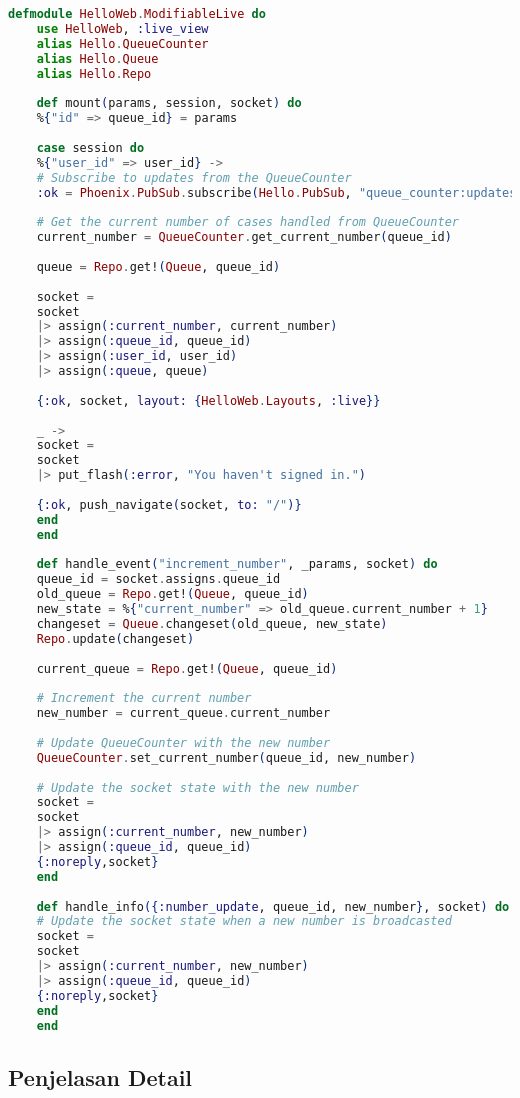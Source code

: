 \begin{lstlisting}[language=Elixir, caption={lib/hello\_web/live/modifiable\_live.ex}]
	defmodule HelloWeb.ModifiableLive do
	use HelloWeb, :live_view
	alias Hello.QueueCounter
	alias Hello.Queue
	alias Hello.Repo
	
	def mount(params, session, socket) do
	%{"id" => queue_id} = params
	
	case session do
	%{"user_id" => user_id} ->
	# Subscribe to updates from the QueueCounter
	:ok = Phoenix.PubSub.subscribe(Hello.PubSub, "queue_counter:updates:#{queue_id}")
	
	# Get the current number of cases handled from QueueCounter
	current_number = QueueCounter.get_current_number(queue_id)
	
	queue = Repo.get!(Queue, queue_id)
	
	socket =
	socket
	|> assign(:current_number, current_number)
	|> assign(:queue_id, queue_id)
	|> assign(:user_id, user_id)
	|> assign(:queue, queue)
	
	{:ok, socket, layout: {HelloWeb.Layouts, :live}}
	
	_ ->
	socket =
	socket
	|> put_flash(:error, "You haven't signed in.")
	
	{:ok, push_navigate(socket, to: "/")}
	end
	end
	
	def handle_event("increment_number", _params, socket) do
	queue_id = socket.assigns.queue_id
	old_queue = Repo.get!(Queue, queue_id)
	new_state = %{"current_number" => old_queue.current_number + 1}
	changeset = Queue.changeset(old_queue, new_state)
	Repo.update(changeset)
	
	current_queue = Repo.get!(Queue, queue_id)
	
	# Increment the current number
	new_number = current_queue.current_number
	
	# Update QueueCounter with the new number
	QueueCounter.set_current_number(queue_id, new_number)
	
	# Update the socket state with the new number
	socket =
	socket
	|> assign(:current_number, new_number)
	|> assign(:queue_id, queue_id)
	{:noreply,socket}
	end
	
	def handle_info({:number_update, queue_id, new_number}, socket) do
	# Update the socket state when a new number is broadcasted
	socket =
	socket
	|> assign(:current_number, new_number)
	|> assign(:queue_id, queue_id)
	{:noreply,socket}
	end
	end
\end{lstlisting}

\subsection{Penjelasan Detail}

